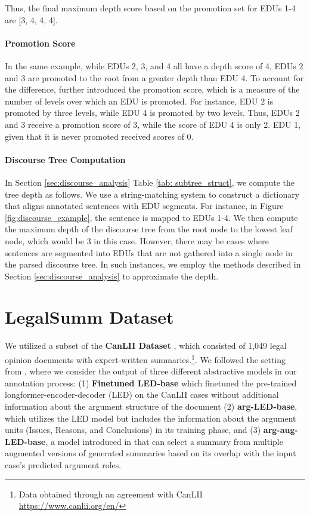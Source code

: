 Thus, the final maximum depth score based on the promotion set for EDUs 1-4 are [3, 4, 4, 4]. 

\paragraph{Promotion Score}
In the same example, while EDUs 2, 3, and 4 all have a depth score of 4, EDUs 2 and 3 are promoted to the root from a greater depth than EDU 4. To account for the difference, \citet{Marcu1998tobuild} further introduced the promotion score, which is a measure of the number
of levels over which an EDU is promoted. For instance, EDU 2 is promoted by three levels, while EDU 4 is promoted by two levels. Thus,
EDUs 2 and 3 receive a promotion score of 3, while the score of EDU 4 is only 2. EDU 1, given that it is never promoted received scores of 0. 


\paragraph{Discourse Tree Computation}
In Section \ref{sec:discourse_analysis} Table \ref{tab: subtree_struct}, we compute the tree depth as follows.
We use a string-matching system to construct a dictionary that aligns annotated sentences with EDU segments. For instance, in Figure \ref{fig:discourse_example}, the sentence is mapped to EDUs 1-4. We then compute the maximum depth of the discourse tree from the root node to the lowest leaf node, which would be 3 in this case. However, there may be cases where sentences are segmented into EDUs that are not gathered into a single node in the parsed discourse tree. In such instances, we employ the methods described in Section \ref{sec:discourse_analysis} to approximate the depth.

\section{LegalSumm Dataset}\label{appendix:legalsumm_detail}
We utilized a subset of the \textbf{CanLII Dataset} \cite{xu2021}, which consisted of 1,049 legal opinion documents with expert-written summaries.\footnote{Data obtained through an agreement with CanLII
\url{https://www.canlii.org/en/}}. We followed the setting from \citet{elaraby-etal-2024-adding}, where we consider the output of three different abstractive models in our annotation process: (1) \textbf{Finetuned LED-base} \cite{elaraby-litman-2022-arglegalsumm} which finetuned
the pre-trained longformer-encoder-decoder \cite{beltagy2020longformer} (LED) on the CanLII cases without additional information about the argument structure
of the document (2) \textbf{arg-LED-base}, which utilizes the LED model but includes the information about the argument units (Issues, Reasons, and Conclusions) in its training phase, and (3) \textbf{arg-aug-LED-base}, a model introduced in \citet{elaraby-etal-2023-towards} that can select a summary from multiple augmented versions of generated summaries based on its overlap with the input case’s predicted argument roles. 

